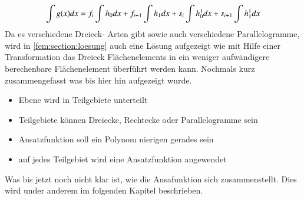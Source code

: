 \begin{equation}
\int g(x) \space dx = f_i \int h_0 \space dx+ f_{i+1}\int h_1 \space dx + s_i\int h_0^1 dx + s_{i+1}\int h_1^1 dx
\label{fem:equation5}
\end{equation}
Da es verschiedene Dreieck- Arten gibt sowie auch verschiedene Parallelogramme, wird in \ref{fem:section:loesung} auch eine Lösung aufgezeigt wie mit Hilfe einer Transformation das Dreieck Flächenelements in ein weniger aufwändigere berechenbare Flächenelement überführt werden kann.
Nochmals kurz zusammengefasst was bis hier hin aufgezeigt wurde.
\begin{itemize}
	\item Ebene wird in Teilgebiete unterteilt
	\item Teilgebiete können Dreiecke, Rechtecke oder Parallelogramme sein
	\item Ansatzfunktion soll ein Polynom nierigen gerades sein
	\item auf jedes Teilgebiet wird eine Ansatzfunktion angewendet
\end{itemize} 
Was bis jetzt noch nicht klar ist, wie die Ansafunktion sich zusammenstellt. Dies wird under anderem im folgenden Kapitel beschrieben.





